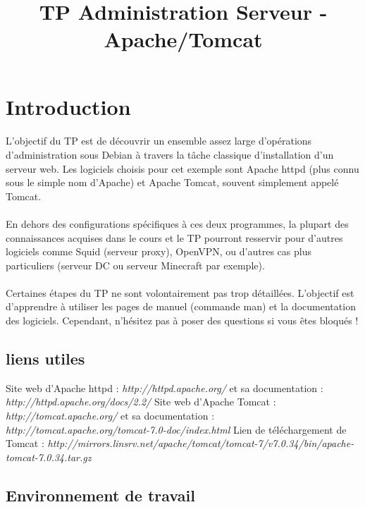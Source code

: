 \documentclass[12pt,a4paper]{article}
\title{TP Administration Serveur - Apache/Tomcat}
\begin{document}
\maketitle{}

\section{Introduction}
\paragraph{}
L'objectif du TP est de découvrir un ensemble assez large d'opérations d'administration sous Debian à travers la tâche classique d'installation d'un serveur web. Les logiciels choisis pour cet exemple sont Apache httpd (plus connu sous le simple nom d'Apache) et Apache Tomcat, souvent simplement appelé Tomcat.

\paragraph{}
En dehors des configurations spécifiques à ces deux programmes, la plupart des connaissances acquises dans le cours et le TP pourront resservir pour d'autres logiciels comme Squid (serveur proxy), OpenVPN, ou d'autres cas plus particuliers (serveur DC ou serveur Minecraft par exemple).

\paragraph{}
Certaines étapes du TP ne sont volontairement pas trop détaillées. L'objectif est d'apprendre à utiliser les pages de manuel (commande man) et la documentation des logiciels. Cependant, n'hésitez pas à poser des questions si vous êtes bloqués !

\subsection{liens utiles}
    
Site web d'Apache httpd : \textit{http://httpd.apache.org/} et sa documentation : \textit{http://httpd.apache.org/docs/2.2/}
Site web d'Apache Tomcat : \textit{http://tomcat.apache.org/} et sa documentation : \textit{http://tomcat.apache.org/tomcat-7.0-doc/index.html}
Lien de téléchargement de Tomcat : \textit{http://mirrors.linsrv.net/apache/tomcat/tomcat-7/v7.0.34/bin/apache-tomcat-7.0.34.tar.gz}

\subsection{Environnement de travail}
\end{document}
